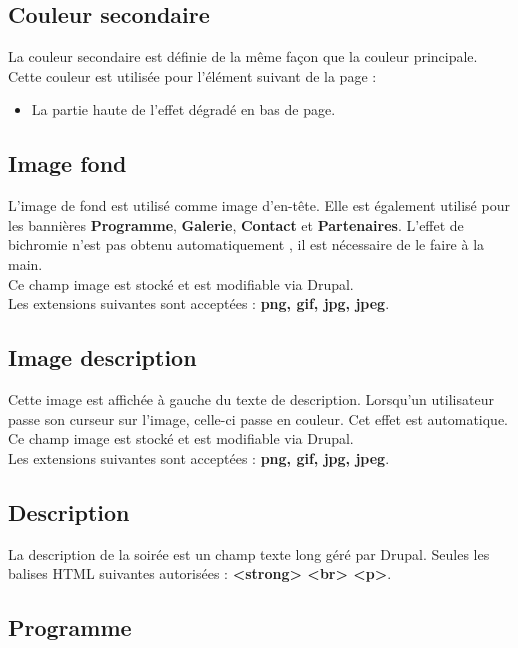 \documentclass[11pt]{report}
\begin{document}
\subsection{Couleur secondaire}

La couleur secondaire est définie de la même façon que la couleur principale.
Cette couleur est utilisée pour l'élément suivant de la page :
\begin{itemize}
	\item La partie haute de l'effet dégradé en bas de page.
\end{itemize}

\subsection{Image fond}

L'image de fond est utilisé comme image d'en-tête. Elle est également utilisé
pour les bannières \textbf{Programme}, \textbf{Galerie}, \textbf{Contact} et
\textbf{Partenaires}. L'effet de bichromie n'est pas obtenu automatiquement , il
est nécessaire de le faire à la main. \\
Ce champ image est stocké et est modifiable via Drupal. \\
Les extensions suivantes sont acceptées : \textbf{png, gif, jpg, jpeg}.

\subsection{Image description}

Cette image est affichée à gauche du texte de description. Lorsqu'un utilisateur
passe son curseur sur l'image, celle-ci passe en couleur. Cet effet est automatique.
Ce champ image est stocké et est modifiable via Drupal. \\
Les extensions suivantes sont acceptées : \textbf{png, gif, jpg, jpeg}.

\subsection{Description}

La description de la soirée est un champ texte long géré par Drupal.
Seules les balises HTML suivantes autorisées : \textbf{<strong> <br> <p>}.

\subsection{Programme}
\end{document}
